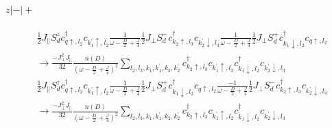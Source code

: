 \documentclass[12pt]{revtex4-2}
\begin{document}
\paragraph{\(z|-|+\)}
\begin{equation}\begin{aligned}
	&\frac{1}{2}J_\parallel S_d^z c^\dagger_{q \uparrow, l_2}c_{k_1^\prime \uparrow, l_2}\frac{1}{\omega - \frac{D}{2} + \frac{J}{4}}\frac{1}{2}J_\perp S_d^- c^\dagger_{k_2 \uparrow, l_3}c_{k_2^\prime \downarrow, l_3} \frac{1}{\omega - \frac{D}{2} + \frac{J}{4}} \frac{1}{2}J_\perp S_d^+ c^\dagger_{k_1 \downarrow, l_2} c_{q \uparrow, l_2} \\
	&\longrightarrow \frac{-J_\perp^2 J_\parallel}{32} \frac{n(D)}{\left(\omega - \frac{D}{2} + \frac{J}{4}\right)^2}\sum_{l_2, l_3, k_1,k_1^\prime,k_2,k_2^\prime}c^\dagger_{k_2 \uparrow, l_3}c_{k_1^\prime \uparrow, l_2}c^\dagger_{k_1 \downarrow, l_2}c_{k_2^\prime \downarrow, l_3}
\end{aligned}\end{equation}
\begin{equation}\begin{aligned}
	&\frac{1}{2}J_\parallel S_d^z c^\dagger_{q \uparrow, l_2}c_{k_1^\prime \uparrow, l_2} \frac{1}{\omega - \frac{D}{2} + \frac{J}{4}} \frac{1}{2}J_\perp S_d^+ c^\dagger_{k_1 \downarrow, l_2} c_{q \uparrow, l_2}\frac{-1}{\omega - \frac{D}{2} + \frac{J}{4}}\frac{1}{2}J_\perp S_d^- c^\dagger_{k_2 \uparrow, l_3}c_{k_2^\prime \downarrow, l_3} \\
	&\longrightarrow \frac{-J_\perp^2 J_\parallel}{32} \frac{n(D)}{\left(\omega - \frac{D}{2} + \frac{J}{4}\right)^2}\sum_{l_2, l_3, k_1,k_1^\prime,k_2,k_2^\prime}c^\dagger_{k_2 \uparrow, l_3}c_{k_1^\prime \uparrow, l_2}c^\dagger_{k_1 \downarrow, l_2}c_{k_2^\prime \downarrow, l_3}
\end{aligned}\end{equation}
\end{document}
